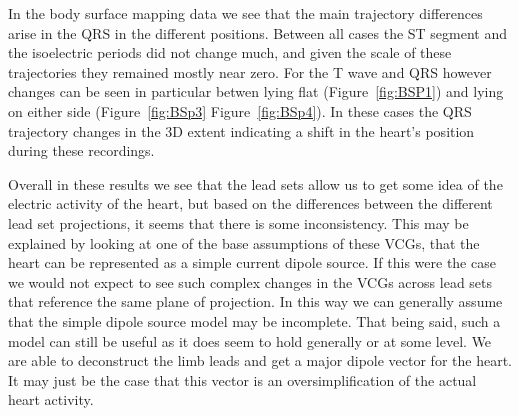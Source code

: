 \documentclass[12pt]{article}
\begin{document}
\par{}
In the body surface mapping data we see that the main trajectory differences arise in the QRS in the different positions. Between all cases the ST segment and the isoelectric periods did not change much, and given the scale of these trajectories they remained mostly near zero. For the T wave and QRS however changes can be seen in particular betwen lying flat (Figure~\ref{fig:BSP1}) and lying on either side (Figure~\ref{fig:BSp3} Figure~\ref{fig:BSp4}). In these cases the QRS trajectory changes in the 3D extent indicating a shift in the heart's position during these recordings.

\par{}
Overall in these results we see that the lead sets allow us to get some idea of the electric activity of the heart, but based on the differences between the different lead set projections, it seems that there is some inconsistency. This may be explained by looking at one of the base assumptions of these VCGs, that the heart can be represented as a simple current dipole source. If this were the case we would not expect to see such complex changes in the VCGs across lead sets that reference the same plane of projection. In this way we can generally assume that the simple dipole source model may be incomplete. That being said, such a model can still be useful as it does seem to hold generally or at some level. We are able to deconstruct the limb leads and get a major dipole vector for the heart. It may just be the case that this vector is an oversimplification of the actual heart activity.

%
%
\end{document}
